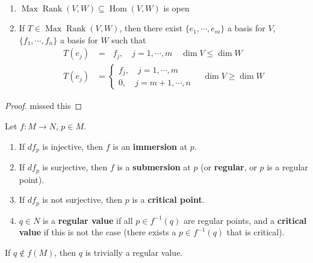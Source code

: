 \begin{lemma}\,
    \begin{enumerate}[label=(\roman*)]
        \item $\operatorname{Max} \operatorname{Rank}(V,W) \subseteq \operatorname{Hom}(V,W)$ is open
        \item If $T \in \operatorname{Max} \operatorname{Rank}(V,W)$, then there exist $\{e_1,\cdots ,e_m\} $ a basis for $V$, $\{f_1,\cdots ,f_n \} $ a basis for $W$ such that 
            \begin{align*}
                T(e_j )&= \ \ \, f_j , \quad j=1,\cdots ,m \quad \dim V \leq \dim W\\
                T(e_j )&=
                \begin{cases}
                    f_j , \quad j=1,\cdots ,m\\
                    0, \quad j=m+1,\cdots ,n
                \end{cases}\quad \dim V \geq \dim W
            \end{align*}
    \end{enumerate}
\end{lemma}
\begin{proof}
    missed this
\end{proof}

\begin{definition}[]
    Let $f \colon M \to N$, $p \in M$.
    \begin{enumerate}[label=(\roman*)]
        \item If $df_p$ is injective, then $f$ is an \textbf{immersion} at $p$.
        \item If $df_p$ is surjective, then $f$ is a \textbf{submersion} at $p$ (or \textbf{regular}, or $p$ is a regular point).
        \item If $df_p$ is not surjective, then $p$ is a \textbf{critical point}.
        \item $q \in N$ is a \textbf{regular value} if all $p \in f^{-1}(q)$ are regular points, and a \textbf{critical value} if this is not the case (there exists a $p \in f^{-1}(q)$ that is critical).
    \end{enumerate}
\end{definition}
\begin{remark}
    If $q \notin f(M)$, then $q$ is trivially a regular value.
\end{remark}

